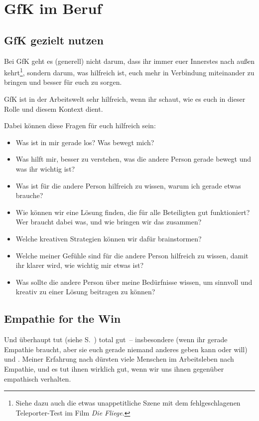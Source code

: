 \section{GfK im Beruf}
\label{gfk-im-beruf}

\subsection{GfK gezielt nutzen}

Bei GfK geht es (generell) nicht darum, dass ihr immer euer Innerstes nach außen kehrt\footnote{Siehe dazu auch die etwas unappetitliche Szene mit dem fehlgeschlagenen Teleporter-Test im Film \emph{Die Fliege}.}, sondern darum, was hilfreich ist, euch mehr in Verbindung miteinander zu bringen und besser für euch zu sorgen.

GfK ist in der Arbeitswelt sehr hilfreich, wenn ihr schaut, wie es euch in dieser Rolle und diesem Kontext dient.

Dabei können diese Fragen für euch hilfreich sein:

\begin{itemize}
    \item Was ist in mir gerade los? Was bewegt mich?
    \item Was hilft mir, besser zu verstehen, was die andere Person gerade bewegt und was ihr wichtig ist?
    \item Was ist für die andere Person hilfreich zu wissen, warum ich gerade etwas brauche?
    \item Wie können wir eine Lösung finden, die für alle Beteiligten gut funktioniert? Wer braucht dabei was, und wie bringen wir das zusammen?
    \item Welche kreativen Strategien können wir dafür brainstormen?
    \item Welche meiner Gefühle sind für die andere Person hilfreich zu wissen, damit ihr klarer wird, wie wichtig mir etwas ist?
    \item Was sollte die andere Person über meine Bedürfnisse wissen, um sinnvoll und kreativ zu einer Lösung beitragen zu können?
\end{itemize}

\subsection{Empathie for the Win}

Und überhaupt tut  (siehe S.~\pageref{empathie}) total gut~-- insbesondere  (wenn ihr gerade Empathie braucht, aber sie euch gerade niemand anderes geben kann oder will) und . Meiner Erfahrung nach dürsten viele Menschen im Arbeitsleben nach Empathie, und es tut ihnen wirklich gut, wenn wir uns ihnen gegenüber empathisch verhalten.

